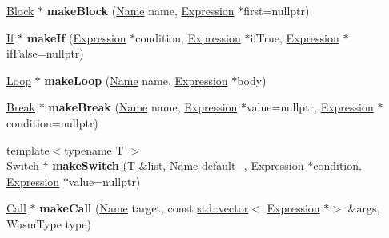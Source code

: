 \begin{DoxyCompactItemize}
\mbox{\hyperlink{classwasm_1_1_block}{Block}} $\ast$ {\bfseries make\+Block} (\mbox{\hyperlink{structwasm_1_1_name}{Name}} name, \mbox{\hyperlink{classwasm_1_1_expression}{Expression}} $\ast$first=nullptr)
\item 
\mbox{\label{classwasm_1_1_builder_aa5d5278a10e1d692bbc7159b5dc322f6}} 
\mbox{\hyperlink{classwasm_1_1_if}{If}} $\ast$ {\bfseries make\+If} (\mbox{\hyperlink{classwasm_1_1_expression}{Expression}} $\ast$condition, \mbox{\hyperlink{classwasm_1_1_expression}{Expression}} $\ast$if\+True, \mbox{\hyperlink{classwasm_1_1_expression}{Expression}} $\ast$if\+False=nullptr)
\item 
\mbox{\label{classwasm_1_1_builder_a7e53bc543d001328b309f5c8deaeeb9c}} 
\mbox{\hyperlink{classwasm_1_1_loop}{Loop}} $\ast$ {\bfseries make\+Loop} (\mbox{\hyperlink{structwasm_1_1_name}{Name}} name, \mbox{\hyperlink{classwasm_1_1_expression}{Expression}} $\ast$body)
\item 
\mbox{\label{classwasm_1_1_builder_a030afa569678efcf79515d58add8363c}} 
\mbox{\hyperlink{classwasm_1_1_break}{Break}} $\ast$ {\bfseries make\+Break} (\mbox{\hyperlink{structwasm_1_1_name}{Name}} name, \mbox{\hyperlink{classwasm_1_1_expression}{Expression}} $\ast$value=nullptr, \mbox{\hyperlink{classwasm_1_1_expression}{Expression}} $\ast$condition=nullptr)
\item 
\mbox{\label{classwasm_1_1_builder_aa076586ae3ae9efb76dd6d7186b2fb68}} 
{\footnotesize template$<$typename T $>$ }\\\mbox{\hyperlink{classwasm_1_1_switch}{Switch}} $\ast$ {\bfseries make\+Switch} (\mbox{\hyperlink{struct_t}{T}} \&\mbox{\hyperlink{classstd_1_1list}{list}}, \mbox{\hyperlink{structwasm_1_1_name}{Name}} default\+\_\+, \mbox{\hyperlink{classwasm_1_1_expression}{Expression}} $\ast$condition, \mbox{\hyperlink{classwasm_1_1_expression}{Expression}} $\ast$value=nullptr)
\item 
\mbox{\label{classwasm_1_1_builder_ad56c30834bbcecf6a728754d7d3eb7ab}} 
\mbox{\hyperlink{classwasm_1_1_call}{Call}} $\ast$ {\bfseries make\+Call} (\mbox{\hyperlink{structwasm_1_1_name}{Name}} target, const \mbox{\hyperlink{classstd_1_1vector}{std\+::vector}}$<$ \mbox{\hyperlink{classwasm_1_1_expression}{Expression}} $\ast$$>$ \&args, Wasm\+Type type)
$$
\end{DoxyCompactItemize}
